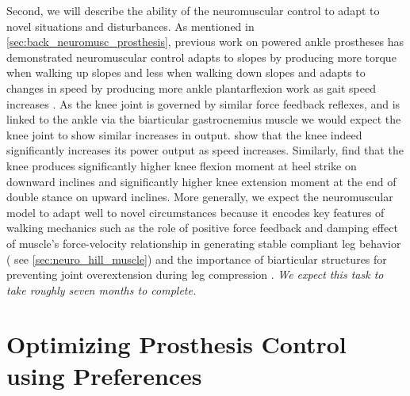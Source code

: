 Second, we will describe the ability of the neuromuscular control to adapt to
novel situations and disturbances. As mentioned in
\cref{sec:back_neuromusc_prosthesis}, previous work on powered ankle prostheses
has demonstrated neuromuscular control adapts to slopes by producing more torque
when walking up slopes and less when walking down slopes
\citep{eilenberg2010control} and adapts to changes in speed by producing more
ankle plantarflexion work as gait speed increases \citep{markowitz2011speed}. As
the knee joint is governed by similar force feedback reflexes, and is linked to
the ankle via the biarticular gastrocnemius muscle we would expect the knee
joint to show similar increases in output. \citet{chen1997influence} show that
the knee indeed significantly increases its power output as speed increases.
Similarly, \citet{mcintosh2006gait} find that the knee produces significantly
higher knee flexion moment at heel strike on downward inclines and significantly
higher knee extension moment at the end of double stance on upward inclines.
More generally, we expect the neuromuscular model to adapt well to novel
circumstances because it encodes key features of walking mechanics such as the
role of positive force feedback and damping effect of muscle's force-velocity
relationship in generating stable compliant leg behavior
(\citep{grey2007positive} see \cref{sec:neuro_hill_muscle}) and the importance
of biarticular structures for preventing joint overextension during leg
compression \citep{seyfarth2001stable}. \emph{We expect this task to take
roughly seven months to complete.}

\section{Optimizing Prosthesis Control using
Preferences}\label{sec:proposed_optimize}


